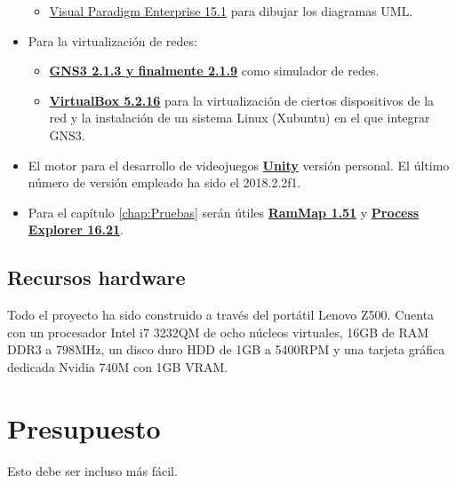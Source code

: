 \begin{itemize}
\begin{itemize}
\item \href{https://www.visual-paradigm.com/}{Visual Paradigm Enterprise 15.1} para dibujar los diagramas UML.
\end{itemize}
\item Para la virtualización de redes:
\begin{itemize}
\item \href{https://www.gns3.com/}{\textbf{GNS3 2.1.3 y finalmente 2.1.9}} como simulador de redes.
\item \href{https://www.virtualbox.org/}{\textbf{VirtualBox 5.2.16}} para la virtualización de ciertos dispositivos de la red y la instalación de un sistema Linux (Xubuntu) en el que integrar GNS3.
\end{itemize}
\item El motor para el desarrollo de videojuegos \href{https://unity3d.com/es}{\textbf{Unity}} versión personal. El último número de versión empleado ha sido el 2018.2.2f1.
\item Para el capítulo \ref{chap:Pruebas} serán útiles \href{https://docs.microsoft.com/en-us/sysinternals/downloads/rammap}{\textbf{RamMap 1.51}} y \href{https://docs.microsoft.com/en-us/sysinternals/downloads/process-explorer}{\textbf{Process Explorer 16.21}}.
\end{itemize}

\subsection{Recursos hardware}
Todo el proyecto ha sido construido a través del portátil Lenovo Z500. Cuenta con un procesador Intel i7 3232QM de ocho núcleos virtuales, 16GB de RAM DDR3 a 798MHz, un disco duro HDD de 1GB a 5400RPM y una tarjeta gráfica dedicada Nvidia 740M con 1GB VRAM.

\section{Presupuesto}
Esto debe ser incluso más fácil.